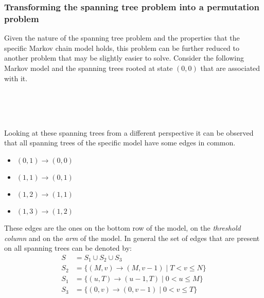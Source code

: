 \subsubsection{Transforming the spanning tree problem into a permutation problem}

Given the nature of the spanning tree problem and the properties that the specific Markov chain model holds, this problem can be further reduced to another problem that may be slightly easier to solve. Consider the following Markov model and the spanning trees rooted at state \((0,0)\) that are associated with it. 

\begin{figure}[h]
    \centering
    \scalebox{0.7}{} \vspace{0.8cm} \\
    \scalebox{0.6}{} \hspace{0.7cm}
    \scalebox{0.6}{} \vspace{0.4cm} \\
    \scalebox{0.6}{} \hspace{0.7cm}
    \scalebox{0.6}{}\vspace{0.4cm} \\
    \scalebox{0.6}{}
\end{figure}

Looking at these spanning trees from a different perspective it can be observed that all spanning trees of the specific model have some edges in common. 

\begin{multicols}{4}
    \begin{itemize}
        \item \((0,1) \rightarrow (0,0)\)
        \item \((1,1) \rightarrow (0,1)\)
        \item \((1,2) \rightarrow (1,1)\)
        \item \((1,3) \rightarrow (1,2)\)
    \end{itemize}
\end{multicols}

These edges are the ones on the bottom row of the model, on the \textit{threshold column} and on the \textit{arm} of the model. In general the set of edges that are present on all spanning trees can be denoted by:
\begin{align} \label{eq:common_edges_set}
    S &= S_1 \cup S_2 \cup S_3 \nonumber\\
    S_2 &= \{(M,v) \rightarrow (M,v-1) \; | \; T < v \leq N\} \nonumber \\
    S_1 &= \{(u,T) \rightarrow (u-1,T) \; | \; 0 < u \leq M\} \nonumber \\
    S_3 &= \{(0,v) \rightarrow (0,v-1) \; | \; 0 < v \leq T\} \nonumber \\
\end{align}

